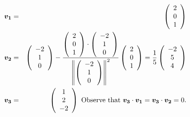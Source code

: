 \documentclass{article}
\newcommand{\bs}[1]{\boldsymbol{#1}}
\begin{document}
\begin{eqnarray}
    \bs{v_1} &=& \left(\begin{array}{c}
      2 \\
      0 \\
      1 \\
    \end{array}\right) \notag\\
    \bs{v_2} &=& \left(\begin{array}{c}
      -2 \\
      1 \\
      0 \\
    \end{array}\right) - \frac{\left(\begin{array}{c}
      2 \\
      0 \\
      1 \\
    \end{array}\right)\cdot \left(\begin{array}{c}
      -2 \\
      1 \\
      0 \\
    \end{array}\right)}{\left\| \left(\begin{array}{c}
      -2 \\
      1 \\
      0 \\
    \end{array}\right)\right\|^2}\left(\begin{array}{c}
      2 \\
      0 \\
      1 \\
    \end{array}\right) = \frac{1}{5}\left(\begin{array}{c}
      -2 \\
      5 \\
      4 \\
    \end{array}\right) \notag\\
    \bs{v_3} &=& \left(\begin{array}{c}
      1 \\
      2 \\
      -2 \\
    \end{array}\right) \text{ Observe that } \bs{v_3}\cdot \bs{v_1} = \bs{v_3}\cdot\bs{v_2} = 0 .\notag
\end{eqnarray}
\end{document}
